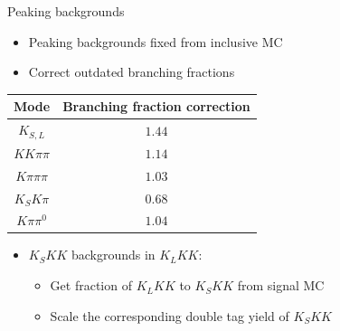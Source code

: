 \documentclass{beamer}
\begin{document}
\begin{frame}{Peaking backgrounds}
  \begin{itemize}
    \item{Peaking backgrounds fixed from inclusive MC}
    \item{Correct outdated branching fractions}
  \end{itemize}
  \vspace{0.5cm}
  \centering
  \def\arraystretch{1.2}%
  \begin{tabular}{c|c}
    Mode          & Branching fraction correction \\
    \hline
    $K_{S, L}$    & $1.44$ \\
    $KK\pi\pi$    & $1.14$ \\
    $K\pi\pi\pi$  & $1.03$ \\
    $K_SK\pi$     & $0.68$ \\
    $K\pi\pi^0$   & $1.04$ \\
    \hline
  \end{tabular}
  \begin{itemize}
    \item{$K_SKK$ backgrounds in $K_LKK$:}
    \begin{itemize}
      \item{Get fraction of $K_LKK$ to $K_SKK$ from signal MC}
      \item{Scale the corresponding double tag yield of $K_SKK$}
    \end{itemize}
  \end{itemize}
\end{frame}
\end{document}
